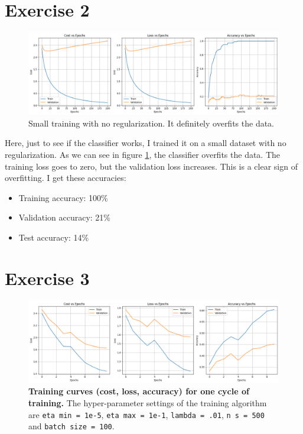 \documentclass{article}
\begin{document}
\section{Exercise 2}

\begin{figure}[H]
    \centering
    \includegraphics[width=\linewidth]{Result_Pics/ex2.png}
    \caption{Small training with no regularization. It definitely overfits the data.}
    \label{fig:ex2}
\end{figure}

Here, just to see if the classifier works, I trained it on a small dataset with no regularization. As we can see in figure \ref{fig:ex2}, the classifier overfits the data. The training loss goes to zero, but the validation loss increases. This is a clear sign of overfitting. I get these accuracies:
\begin{itemize}
    \item Training accuracy: 100\%
    \item Validation accuracy: 21\%
    \item Test accuracy: 14\%
\end{itemize}

\section{Exercise 3}

\begin{figure}[H]
    \centering
    \includegraphics[width=\linewidth]{Result_Pics/ex3.png}
    \caption{\textbf{Training curves (cost, loss, accuracy) for one cycle of training.} The hyper-parameter settings
        of the training algorithm are \texttt{eta min = 1e-5}, \texttt{eta max = 1e-1}, \texttt{lambda = .01}, \texttt{n s = 500} and \texttt{batch size = 100}.}
    \label{fig:ex3}
\end{figure}
\end{document}
